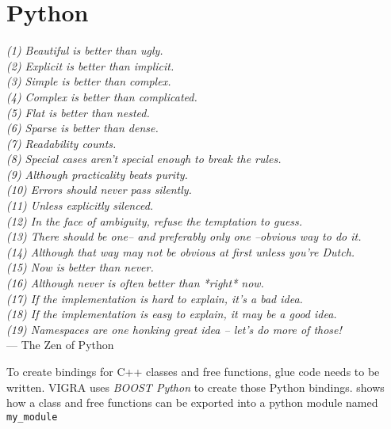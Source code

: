 \section{Python}\label{sec:graph_lib_python}

\begin{scriptsize}
\begin{flushright}{\slshape    
(1) Beautiful is better than ugly. \\ \label{cit:line_a}
(2) Explicit is better than implicit. \\ \label{cit:line_b}
(3) Simple is better than complex. \\
(4) Complex is better than complicated. \\
(5) Flat is better than nested. \\
(6) Sparse is better than dense. \\
(7) Readability counts. \\
(8) Special cases aren't special enough to break the rules. \\
(9) Although practicality beats purity. \\
(10) Errors should never pass silently. \\
(11) Unless explicitly silenced. \\
(12) In the face of ambiguity, refuse the temptation to guess. \\
(13) There should be one-- and preferably only one --obvious way to do it. \\
(14) Although that way may not be obvious at first unless you're Dutch. \\
(15) Now is better than never. \\
(16) Although never is often better than *right* now. \\
(17) If the implementation is hard to explain, it's a bad idea. \\
(18) If the implementation is easy to explain, it may be a good idea. \\
(19) Namespaces are one honking great idea -- let's do more of those! } \\ \medskip
--- The Zen of Python
\end{flushright}
\end{scriptsize}


To create bindings for C++ classes and free functions, glue code needs to 
be written. VIGRA\citep{ software_vigra,koethe_2000_phd_thesis} uses \emph{BOOST Python}\citep{ boost_python}  to create those Python bindings.
 shows how a  class and free functions can
be exported into a python module named \lstinline{my_module}

